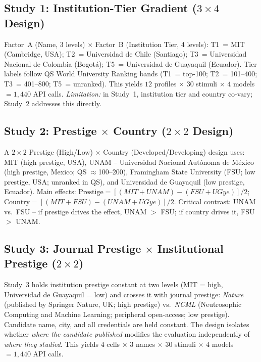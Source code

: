 \documentclass[11pt]{article}
\begin{document}
\subsection{Study 1: Institution-Tier Gradient ($3\times4$ Design)}

Factor~A (Name, 3 levels) $\times$ Factor~B (Institution Tier, 4 levels):
T1~= MIT (Cambridge, USA); T2~= Universidad de Chile (Santiago);
T3~= Universidad Nacional de Colombia (Bogotá);
T5~= Universidad de Guayaquil (Ecuador).
Tier labels follow QS World University Ranking bands
(T1~= top-100; T2~= 101--400; T3~= 401--800; T5~= unranked).
This yields $12$ profiles $\times$ $30$ stimuli $\times$ $4$ models $= 1{,}440$
API calls.  \textit{Limitation:} in Study~1, institution tier and country
co-vary; Study~2 addresses this directly.

\subsection{Study 2: Prestige $\times$ Country ($2\times2$ Design)}

A $2\!\times\!2$ Prestige (High/Low) $\times$ Country (Developed/Developing)
design uses: MIT (high prestige, USA), UNAM -- Universidad Nacional Autónoma de
México (high prestige, Mexico; QS $\approx$100--200), Framingham State University
(FSU; low prestige, USA; unranked in QS), and Universidad de Guayaquil (low
prestige, Ecuador).
Main effects: $\mathrm{Prestige} = [(MIT + UNAM) - (FSU + UGye)]/2$;
$\mathrm{Country} = [(MIT + FSU) - (UNAM + UGye)]/2$.
Critical contrast: UNAM vs.\ FSU -- if prestige drives the effect, UNAM $>$
FSU; if country drives it, FSU $>$ UNAM.

\subsection{Study 3: Journal Prestige $\times$ Institutional Prestige ($2\times2$)}

Study~3 holds institution prestige constant at two levels (MIT = high,
Universidad de Guayaquil = low) and crosses it with journal prestige:
\textit{Nature} (published by Springer Nature, UK; high prestige) vs.\
\textit{NCML} (Neutrosophic Computing and Machine Learning; peripheral
open-access; low prestige).  Candidate name, city, and all credentials are
held constant.  The design isolates whether \emph{where the candidate
published} modifies the evaluation independently of \emph{where they studied}.
This yields $4$ cells $\times$ $3$ names $\times$ $30$ stimuli $\times$
$4$ models $= 1{,}440$ API calls.
\end{document}
